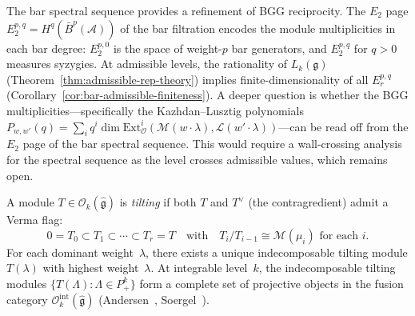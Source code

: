 \begin{remark}\label{rem:bgg-bar-spectral}
The bar spectral sequence provides a refinement of BGG reciprocity.  The $E_2$ page $E_2^{p,q} = H^q(\bar{B}^p(\mathcal{A}))$ of the bar filtration encodes the module multiplicities in each bar degree: $E_2^{p,0}$ is the space of weight-$p$ bar generators, and $E_2^{p,q}$ for $q > 0$ measures syzygies.  At admissible levels, the rationality of $L_k(\mathfrak{g})$ (Theorem~\ref{thm:admissible-rep-theory}) implies finite-dimensionality of all $E_r^{p,q}$ (Corollary~\ref{cor:bar-admissible-finiteness}).  A deeper question is whether the BGG multiplicities---specifically the Kazhdan--Lusztig polynomials $P_{w,w'}(q) = \sum_i q^i \dim \mathrm{Ext}^i_{\mathcal{O}}(\mathcal{M}(w \cdot \lambda), \mathcal{L}(w' \cdot \lambda))$---can be read off from the $E_2$ page of the bar spectral sequence.  This would require a wall-crossing analysis for the spectral sequence as the level crosses admissible values, which remains open.
\end{remark}

\begin{definition}\label{def:tilting-module}
A module $T \in \mathcal{O}_k(\widehat{\mathfrak{g}})$ is
\emph{tilting} if both $T$ and $T^\vee$ (the contragredient)
admit a Verma flag:
\[
0 = T_0 \subset T_1 \subset \cdots \subset T_r = T
\quad\text{with}\quad
T_i/T_{i-1} \cong \mathcal{M}(\mu_i)
\text{ for each } i.
\]
For each dominant weight~$\lambda$, there exists a unique
indecomposable tilting module $T(\lambda)$ with highest
weight~$\lambda$.  At integrable level~$k$, the indecomposable
tilting modules $\{T(\Lambda) : \Lambda \in P_+^k\}$ form a
complete set of projective objects in the fusion category
$\mathcal{O}_k^{\mathrm{int}}(\widehat{\mathfrak{g}})$
(Andersen~\cite{Andersen92}, Soergel~\cite{Soergel97}).
\end{definition}

